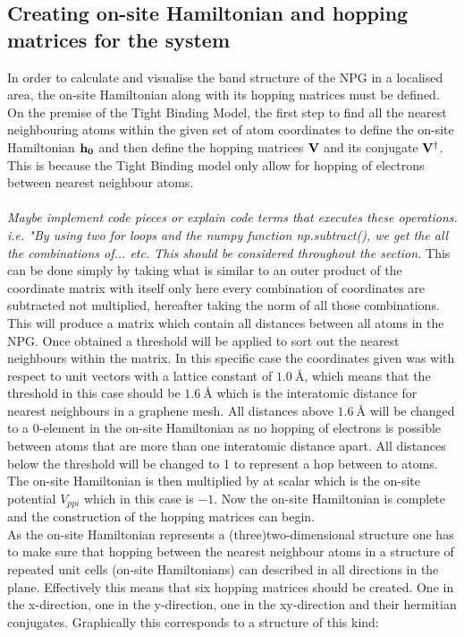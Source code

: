 \subsection{Creating on-site Hamiltonian and hopping matrices for the system}
In order to calculate and visualise the band structure of the NPG in a localised area, the on-site Hamiltonian along with its hopping matrices must be defined. On the premise of the Tight Binding Model, the first step to find all the nearest neighbouring atoms within the given set of atom coordinates to define the on-site Hamiltonian \(\bf{h}_0\) and then define the hopping matrices \(\bf{V}\) and its conjugate \(\bf{V}^{\dagger}\). This is because the Tight Binding model only allow for hopping of electrons between nearest neighbour atoms.\\
\\
\textit{Maybe implement code pieces or explain code terms that executes these operations. i.e. "By using two for loops and the numpy function np.subtract(), we get the all the combinations of... etc. This should be considered throughout the section.} This can be done simply by taking what is similar to an outer product of the coordinate matrix with itself only here every combination of coordinates are subtracted not multiplied, hereafter taking the norm of all those combinations. This will produce a matrix which contain all distances between all atoms in the NPG. Once obtained a threshold will be applied to sort out the nearest neighbours within the matrix. In this specific case the coordinates given was with respect to unit vectors with a lattice constant of \(\SI{1.0}{\angstrom}\), which means that the threshold in this case should be \(\SI{1.6}{\angstrom}\) which is the interatomic distance for nearest neighbours in a graphene mesh. All distances above \(\SI{1.6}{\angstrom}\) will be changed to a 0-element in the on-site Hamiltonian as no hopping of electrons is possible between atoms that are more than one interatomic distance apart. All distances below the threshold will be changed to 1 to represent a hop between to atoms. The on-site Hamiltonian is then multiplied by at scalar which is the on-site potential \(V_{ppi}\) which in this case is \(-1\). Now the on-site Hamiltonian is complete and the construction of the hopping matrices can begin. \\
As the on-site Hamiltonian represents a (three)two-dimensional structure one has to make sure that hopping between the nearest neighbour atoms in a structure of repeated unit cells (on-site Hamiltonians) can described in all directions in the plane. Effectively this means that six hopping matrices should be created. One in the x-direction, one in the y-direction, one in the xy-direction and their hermitian conjugates. Graphically this corresponds to a structure of this kind:
